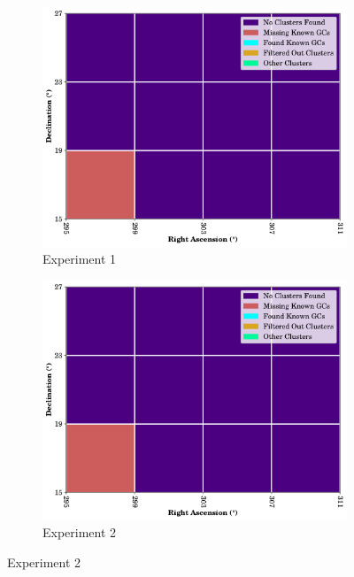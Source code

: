 \begin{figure}[H]
    \centering
    \caption{\label{fig:a2-4x4-cluster-overview}Clustering Results Across A2: $\SI{4.0}{\degree}\times\SI{4.0}{\degree}$ for All Experiments}
    \begin{subfigure}[b]{0.49\textwidth}
        \includegraphics[width=\textwidth]{./figures/rasters/grids/grid-run-01-a2-4x4.pdf}
        \caption{Experiment 1}
    \end{subfigure}
    \begin{subfigure}[b]{0.49\textwidth}
        \includegraphics[width=\textwidth]{./figures/rasters/grids/grid-run-02-a2-4x4.pdf}
        \caption{Experiment 2}
    \end{subfigure}


\end{figure}
